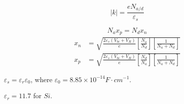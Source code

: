 \documentclass[a4paper, twocolumn]{article}
\begin{document}
\begin{minipage}{\linewidth}
\begin{minipage}[b]{0.49\linewidth}
            \begin{equation*}
                |k| = \frac{e N_{a/d}}{\varepsilon_s} 
            \end{equation*}
        \end{minipage}
    \end{minipage}
    
            \begin{equation*}
                N_a x_p = N_d x_n
            \end{equation*}
            \begin{equation*}
                \begin{aligned}
                    x_n &= \sqrt{\frac{2 \varepsilon_s \left( V_{bi} + V_R \right)}{e} \left[ \frac{N_a}{N_d}  \right]\left[ \frac{1}{N_a + N_d}  \right]} \\
                    x_p &= \sqrt{\frac{2 \varepsilon_s \left( V_{bi} + V_R \right)}{e} \left[ \frac{N_d}{N_a}  \right]\left[ \frac{1}{N_a + N_d}  \right]}
                \end{aligned}
            \end{equation*}
            \par $\varepsilon_s = \varepsilon_r \varepsilon_0$, where $\varepsilon_0 = 8.85 \times 10^{-14} F \cdot cm^{-1}$.
            \par $\varepsilon_r = 11.7$ for $Si$.
    
\end{document}
